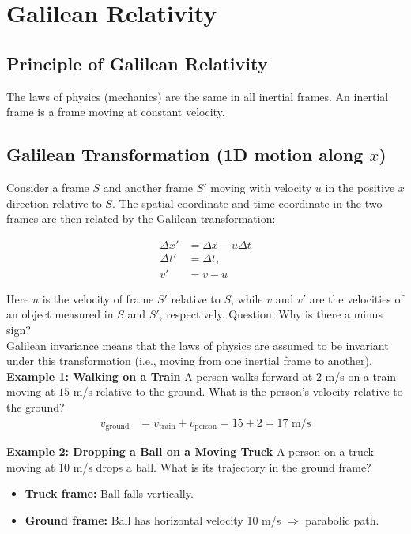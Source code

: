 \documentclass[12pt]{article}
\newcommand{\be}{\begin{eqnarray}}
\newcommand{\ee}{\end{eqnarray}}
\begin{document}
\section{Galilean Relativity}\label{sec:GR}
\subsection{Principle of Galilean Relativity}
The laws of physics (mechanics) are the same in all inertial frames. An inertial frame is a frame moving at constant velocity. 

\subsection{Galilean Transformation (1D motion along $x$)}

Consider a frame $S$ and another frame $S'$ moving with velocity $u$ in the positive $x$ direction relative to $S$. The spatial coordinate and time coordinate in the two frames are then related by the Galilean transformation:
\begin{tcolorbox}[colback=blue!5!white]
\vspace{-1.3em}
\begin{align}
\Delta x' &= \Delta x - u \Delta t \\
\Delta t' &= \Delta t, \\
v' &= v - u
\end{align}
\end{tcolorbox}
\noindent 
Here $u$ is the velocity of frame $S'$ relative to $S$, while $v$ and $v'$ are the velocities of an object measured in $S$ and $S'$, respectively. Question: Why is there a minus sign?  \\
Galilean invariance means that the laws of physics are assumed to be invariant under this transformation (i.e., moving from one inertial frame to another). \\

\noindent
{\bf Example 1: Walking on a Train}
A person walks forward at $2$ m/s on a train moving at $15$ m/s relative to the ground. What is the person's velocity relative to the ground?
\be
v_{\text{ground}} &= v_{\text{train}} + v_{\text{person}} = 15 + 2 = 17 \text{ m/s}
\ee

\noindent
{\bf Example 2: Dropping a Ball on a Moving Truck}
A person on a truck moving at 10 m/s drops a ball. What is its trajectory in the ground frame?
\begin{itemize}
    \item \textbf{Truck frame:} Ball falls vertically.
    \item \textbf{Ground frame:} Ball has horizontal velocity 10 m/s $\Rightarrow$ parabolic path.
\end{itemize}
\end{document}
